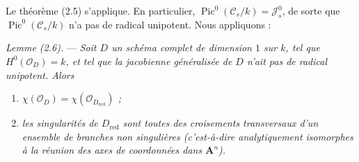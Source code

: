 \documentclass[10pt]{article}
\newcommand{\Pic}{\operatorname{Pic}}
\newcommand{\cO}{\mathcal O}
\newcommand{\A}{\mathbf A}
\begin{document}
Le théorème (2.5) s'applique. En particulier, $\Pic^0(\mathscr C_s/k)=\mathscr J_s^0$, de sorte que $\Pic^0(\mathscr C_s/k)$ n'a pas de radical unipotent. Nous appliquons :

\medskip
\noindent\emph{Lemme (2.6).} --- \emph{Soit $D$ un schéma complet de dimension $1$ sur $k$, tel que $H^0(\cO_D)=k$, et tel que la jacobienne généralisée de $D$ n'ait pas de radical unipotent. Alors}
\begin{enumerate}[label=(\roman*)]
\item \emph{$\chi(\cO_D)=\chi(\cO_{D_{\mathrm{red}}})$ ;}
\item \emph{les singularités de $D_{\mathrm{red}}$ sont toutes des croisements transversaux d'un ensemble de branches non singulières (c'est-à-dire analytiquement isomorphes à la réunion des axes de coordonnées dans $\A^n$).}
\end{enumerate}
\end{document}
